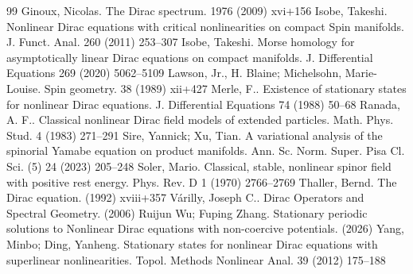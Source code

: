 \documentclass[10pt,a4paper]{amsart}
\begin{document}
\begin{thebibliography}{99}
 Ginoux, Nicolas. The {D}irac spectrum. 1976 (2009) xvi+156
 Isobe, Takeshi. Nonlinear {D}irac equations with critical nonlinearities on compact {S}pin manifolds. J. Funct. Anal. 260 (2011) 253--307
 Isobe, Takeshi. Morse homology for asymptotically linear {D}irac equations on compact manifolds. J. Differential Equations 269 (2020) 5062--5109
 Lawson, Jr., H. Blaine; Michelsohn, Marie-Louise. Spin geometry. 38 (1989) xii+427
 Merle, F.. Existence of stationary states for nonlinear {D}irac equations. J. Differential Equations 74 (1988) 50--68
 Ranada, A. F.. Classical nonlinear Dirac field models of extended particles. Math. Phys. Stud. 4 (1983) 271--291
 Sire, Yannick; Xu, Tian. A variational analysis of the spinorial {Y}amabe equation on product manifolds. Ann. Sc. Norm. Super. Pisa Cl. Sci. (5) 24 (2023) 205--248
 Soler, Mario. Classical, stable, nonlinear spinor field with positive rest energy. Phys. Rev. D 1 (1970) 2766--2769
 Thaller, Bernd. The {D}irac equation. (1992) xviii+357
 V{\'a}rilly, Joseph C.. Dirac Operators and Spectral Geometry. (2006)
 Ruijun Wu; Fuping Zhang. Stationary periodic solutions to Nonlinear Dirac equations with non-coercive potentials. (2026)
 Yang, Minbo; Ding, Yanheng. Stationary states for nonlinear {D}irac equations with superlinear nonlinearities. Topol. Methods Nonlinear Anal. 39 (2012) 175--188
\end{thebibliography}
\end{document}
